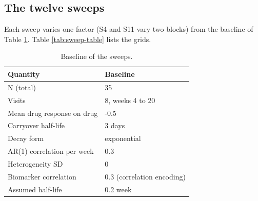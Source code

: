 \documentclass[
  11pt,
]{article}
\begin{document}
\begin{table}
\centering
\caption{\label{tab:feas-tab-s10}S10. Smallest eigenvalue by biomarker correlation (rows) and design with half-life in days (columns), correlation encoding. A negative value is infeasible.}
\centering
{}
\end{table}

\subsection{The twelve sweeps}\label{sweeps}

Each sweep varies one factor (S4 and S11 vary two blocks) from the baseline of Table \ref{tab:baseline}. Table \ref{tab:sweep-table} lists the grids.

\begin{table}

\caption{\label{tab:baseline}Baseline of the sweeps.}
\centering
\begin{tabular}[t]{ll}
\toprule
Quantity & Baseline\\
\midrule
N (total) & 35\\
Visits & 8, weeks 4 to 20\\
Mean drug response on drug & -0.5\\
Carryover half-life & 3 days\\
Decay form & exponential\\
\addlinespace
AR(1) correlation per week & 0.3\\
Heterogeneity SD & 0\\
Biomarker correlation & 0.3 (correlation encoding)\\
Assumed half-life & 0.2 week\\
\bottomrule
\end{tabular}
\end{table}
\end{document}
